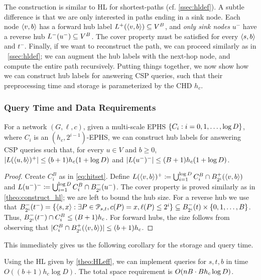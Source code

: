 The construction is similar to HL for shortest-paths (cf. \cref{ssec:hldef}).
A subtle difference is that we are only interested in paths ending in a sink node.
Each node $\pp{v,b}$ has a forward hub label $\Lf(\pp{v,b})\subseteq V^B$, and \emph{only sink nodes} $u^-$ have a reverse hub $\Lb(u^-)\subseteq V^B$.
The cover property must be satisfied for every $\pp{s,b}$ and $t^-$.
Finally, if we want to reconstruct the path, we can proceed similarly as in ~\cref{ssec:hldef}; we can augment the hub labels with the next-hop node, and compute the entire path recursively.
Putting things together, we now show how we can construct hub labels for answering CSP queries, such that their preprocessing time and storage is parameterized by the CHD $h_c$.

\subsubsection{Query Time and Data Requirements}

\begin{theorem}
\label{theo:HLeff}
For a network $(G,\ell,c)$, given a multi-scale EPHS $\crl*{C_i:i=0,1,\ldots,\log D}$, where $C_i$ is an $(h_c,2^{i-1})$-EPHS, we can construct hub labels for answering CSP queries such that, for every $u\in V$ and $b\geq 0$, $\card{L(\pp{u,b})^+}\leq (b+1)h_c(1+\log D)$ and $\card{L(u^-)^-}\leq (B+1)h_c(1+\log D)$. 
\end{theorem}
\begin{proof}
Create $C_i^B$ as in \cref{eq:hitset}.
Define $L(\pp{v,b})^+ \defeq \bigcup_{i=1}^{\log D} C_i^B\cap \Bf_{2^i}(\pp{v,b})$ and $L(u^-)^-  \defeq \bigcup_{i=1}^{\log D} C_i^B\cap \Bb_{2^i}(u^-)$.
The cover property is proved similarly as in \cref{theo:construct_hl}; we are left to bound the hub size.
For a reverse hub we use that $\Bb_{2^i}(t^-) = \{\pp{s,x}: \exists P\in \Pst, c(P)=x, \ell(P)\leq 2^i\}
\subseteq \Bb_{2^i}(t)\times \{0,1,\ldots,B\}$.
Thus, $\Bb_{2^i}(t^-)\cap C_i^B\leq (B+1)h_c$.
For forward hubs, the size follows from observing that $ \card{C_i^B\cap \Bf_{2^i}(\pp{v,b})}\leq (b+1)h_c$.
\end{proof}

This immediately gives us the following corollary for the storage and query time.
\begin{corollary}
Using the HL given by \cref{theo:HLeff}, we can implement queries for $s,t,b$ in time $O((b+1) h_c\log D)$.
The total space requirement is $\Or(nB \cdot Bh_c\log D)$.
\end{corollary}